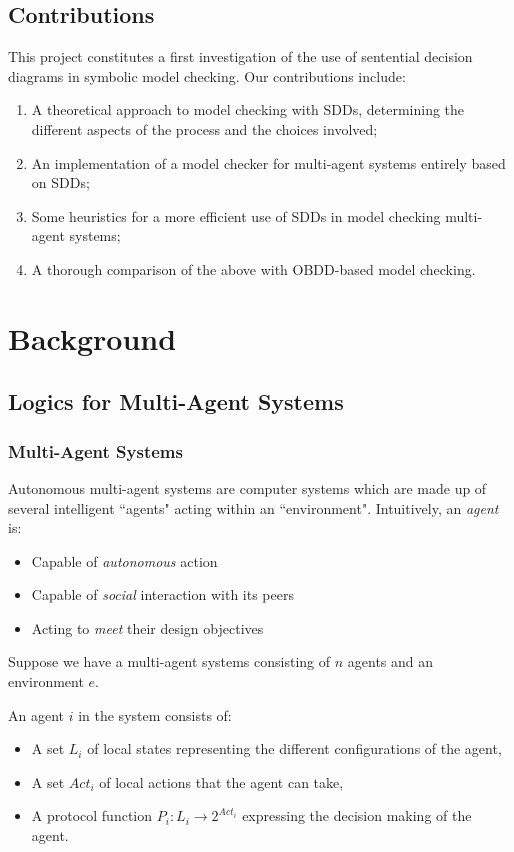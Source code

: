 \documentclass[11pt]{report}
\newenvironment{definition}[1][Definition]{\begin{trivlist}
\item[\hskip \labelsep {\bfseries #1}]}{\end{trivlist}}
\begin{document}
\section{Contributions}

This project constitutes a first investigation of the use of sentential decision diagrams in symbolic model checking. Our contributions include: 
\begin{enumerate}
\item A theoretical approach to model checking with SDDs, determining the different aspects of the process and the choices involved;
\item An implementation of a model checker for multi-agent systems entirely based on SDDs;
\item Some heuristics for a more efficient use of SDDs in model checking multi-agent systems;
\item A thorough comparison of the above with OBDD-based model checking.
\end{enumerate}




\chapter{Background}

\section{Logics for Multi-Agent Systems}

\subsection{Multi-Agent Systems}

Autonomous multi-agent systems are computer systems which are made up of several intelligent ``agents" acting within an ``environment". 
Intuitively, an \textit{agent} is: 
\begin{itemize}
\item Capable of \textit{autonomous} action 
\item Capable of \textit{social} interaction with its peers
\item Acting to \textit{meet} their design objectives 
\end{itemize}
 
Suppose we have a multi-agent systems consisting of $n$ agents and an environment $e$.
\begin{definition} 
An agent $i$ in the system consists of: 
\begin{itemize}
\item A set $L_i$ of local states representing the different configurations of the agent,
\item A set $Act_i$ of local actions that the agent can take,
\item A protocol function $P_i : L_i \rightarrow 2^{Act_i} $ expressing the decision making of the agent.
\end{itemize} 
\end{definition}
\end{document}
